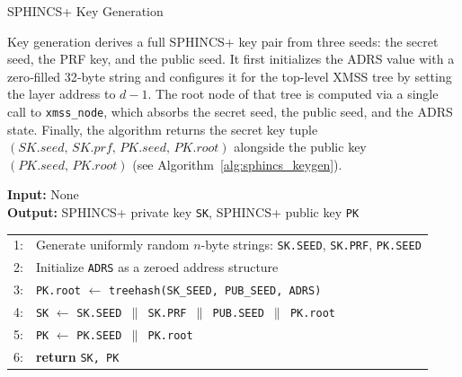 \begin{subsection}{SPHINCS+ Key Generation}

Key generation derives a full SPHINCS+ key pair from three seeds: the secret seed, the PRF key, and the public seed. It first initializes the ADRS value with a zero‐filled 32‐byte string and configures it for the top-level XMSS tree by setting the layer address to \(d-1\). The root node of that tree is computed via a single call to \texttt{xmss\_node}, which absorbs the secret seed, the public seed, and the ADRS state. Finally, the algorithm returns the secret key tuple \((\mathit{SK}.\mathit{seed},\,\mathit{SK}.\mathit{prf},\,\mathit{PK}.\mathit{seed},\,\mathit{PK}.\mathit{root})\) alongside the public key \((\mathit{PK}.\mathit{seed},\,\mathit{PK}.\mathit{root})\) (see Algorithm~\ref{alg:sphincs_keygen}).

\begin{algorithm}
\caption{SPHINCS\_keyGen -- Generate a SPHINCS+ key pair}
\label{alg:sphincs_keygen}

\textbf{Input:} None \\
\textbf{Output:} SPHINCS+ private key \texttt{SK}, SPHINCS+ public key \texttt{PK}

\vspace{0.3cm}

\begin{tabular}{ll}
1: & Generate uniformly random $n$-byte strings: \texttt{SK.SEED}, \texttt{SK.PRF}, \texttt{PK.SEED} \\
2: & Initialize \texttt{ADRS} as a zeroed address structure \\
3: & \texttt{PK.root} $\leftarrow$ \texttt{treehash(SK\_SEED, PUB\_SEED, ADRS)} \\
4: & \texttt{SK} $\leftarrow$ \texttt{SK.SEED $\parallel$ SK.PRF $\parallel$ PUB.SEED $\parallel$ PK.root} \\
5: & \texttt{PK} $\leftarrow$ \texttt{PK.SEED $\parallel$ PK.root} \\
6: & \textbf{return} \texttt{SK, PK}
\end{tabular}
\end{algorithm}

\end{subsection}

